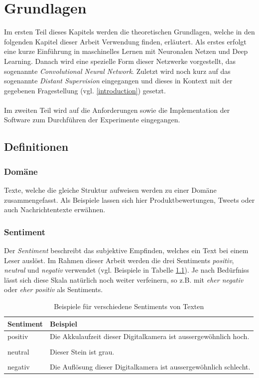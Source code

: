  \chapter{Grundlagen}
Im ersten Teil dieses Kapitels werden die theoretischen Grundlagen, welche in den folgenden Kapitel dieser Arbeit Verwendung finden, erläutert. Als erstes erfolgt eine kurze Einführung in maschinelles Lernen mit Neuronalen Netzen und Deep Learning. Danach wird eine spezielle Form dieser Netzwerke vorgestellt, das sogenannte \emph{Convolutional Neural Network}. Zuletzt wird noch kurz auf das sogenannte \emph{Distant Supervision} \cite{go2009twitter} eingegangen und dieses in Kontext mit der gegebenen Fragestellung (vgl. \ref{introduction}) gesetzt.\\\\
Im zweiten Teil wird auf die Anforderungen sowie die Implementation der Software zum Durchführen der Experimente eingegangen.

\section{Definitionen}

\subsection{Domäne}
Texte, welche die gleiche Struktur aufweisen werden zu einer Domäne zusammengefasst. Als Beispiele lassen sich hier Produktbewertungen, Tweets oder auch Nachrichtentexte erwähnen.

\subsection{Sentiment}
Der \emph{Sentiment} beschreibt das subjektive Empfinden, welches ein Text bei einem Leser auslöst. Im Rahmen dieser Arbeit werden  die drei Sentiments \emph{positiv}, \emph{neutral} und \emph{negativ} verwendet (vgl. Beispiele in Tabelle \ref{basics:sentiments_example_table}). Je nach Bedürfniss lässt sich diese Skala natürlich noch weiter verfeinern, so z.B. mit \emph{eher negativ} oder \emph{eher positiv} als Sentiments.\\
\begin{table}[h]
	\centering
	\begin{tabular}{@{}ll@{}}
		\toprule
		Sentiment & Beispiel\\ \midrule
		positiv & Die Akkulaufzeit dieser Digitalkamera ist aussergewöhnlich hoch.\\
		&\\
		neutral & Dieser Stein ist grau.\\
		&\\
		negativ & Die Auflösung dieser Digitalkamera ist aussergewöhnlich schlecht.\\
		\bottomrule
	\end{tabular}
	\caption{Beispiele für verschiedene Sentiments von Texten}
	\label{basics:sentiments_example_table}
\end{table}

